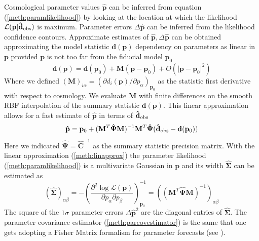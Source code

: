 \documentclass[reprint,aps,prd,superscriptaddress,showkeys,showpacs]{revtex4-1}
\newcommand{\bb}[1]{\mathbf{#1}}
\newcommand{\bbh}[1]{\mathbf{\hat{#1}}}
\begin{document}
%
Cosmological parameter values $\bbh{p}$ can be inferred from equation (\ref{meth:paramlikelihood}) by looking at the location at which the likelihood $\mathcal{L}(\bb{p}\vert\bbh{d}_{\rm obs})$ is maximum. Parameter errors $\Delta\bbh{p}$ can be inferred from the likelihood confidence contours. Approximate estimates of $\bbh{p},\Delta \bbh{p}$ can be obtained approximating the model statistic $\bb{d}(\bb{p})$ dependency on parameters as linear in $\bb{p}$ provided $\bb{p}$ is not too far from the fiducial model $\bb{p}_0$
\begin{equation}
\label{meth:linapprox}
\bb{d}(\bb{p}) = \bb{d}(\bb{p}_0) + \bb{M}(\bb{p}-\bb{p}_0) + O(\vert\bb{p}-\bb{p}_0\vert^2)
\end{equation} 
%
Where we defined $(\bb{M})_{i\alpha}=(\partial d_i(\bb{p})/\partial p_\alpha)_{\bb{p}_0}$ as the statistic first derivative with respect to cosmology. We evaluate $\bb{M}$ with finite differences on the smooth RBF interpolation of the summary statistic $\bb{d}(\bb{p})$. This linear approximation allows for a fast estimate of $\bbh{p}$ in terms of $\bbh{d}_{\rm obs}$
\begin{equation}
\label{meth:parestimate}
\bbh{p} = \bb{p}_0 + (\bb{M}^T\bbh{\Psi}\bb{M})^{-1}\bb{M}^T\bbh{\Psi}(\bbh{d}_{\rm obs}-\bb{d}(\bb{p}_0))
\end{equation}
%
Here we indicated $\bbh{\Psi}=\bbh{C}^{-1}$ as the summary statistic precision matrix. With the linear approximation (\ref{meth:linapprox}) the parameter likelihood (\ref{meth:paramlikelihood}) is a multivariate Gaussian in $\bb{p}$ and its width $\bbh{\Sigma}$ can be estimated as 
\begin{equation}
\label{meth:parcovestimator}
(\bbh{\Sigma})_{\alpha\beta} = -\left(\frac{\partial^2 \log \mathcal{L}(\bb{p})}{\partial p_\alpha \partial p_\beta}\right)^{-1}_{\bb{p}_0} = ((\bb{M}^T\bbh{\Psi}\bb{M})^{-1})_{\alpha\beta}
\end{equation}
%
The square of the $1\sigma$ parameter errors $\Delta \bbh{p}^2$ are the diagonal entries of $\bbh{\Sigma}$. The parameter covariance estimator (\ref{meth:parcovestimator}) is the same that one gets adopting a Fisher Matrix formalism for parameter forecasts (see \citep{astroMLText}).
\end{document}

